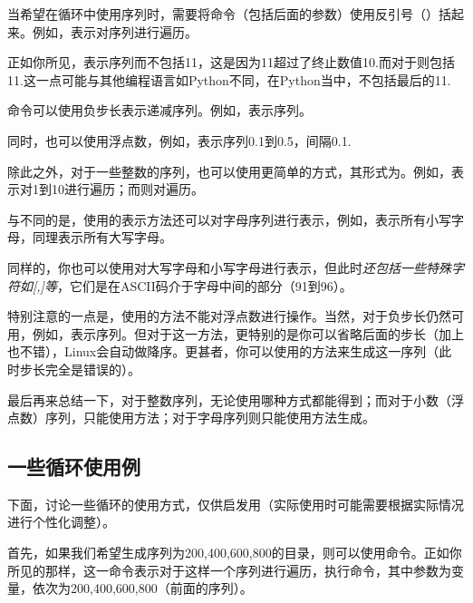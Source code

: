 当希望在循环中使用序列时，需要将命令（包括后面的参数）使用反引号（）括起来。例如，表示对序列进行遍历。

\begin{attention}
    正如你所见，表示序列而不包括11，这是因为11超过了终止数值10.而对于则包括11.这一点可能与其他编程语言如Python不同，在Python当中，不包括最后的11.

    命令可以使用负步长表示递减序列。例如，表示序列。

    同时，也可以使用浮点数，例如，表示序列0.1到0.5，间隔0.1.
\end{attention}

除此之外，对于一些整数的序列，也可以使用更简单的方式，其形式为。例如，表示对1到10进行遍历；而则对遍历。

与不同的是，使用的表示方法还可以对字母序列进行表示，例如，表示所有小写字母，同理表示所有大写字母。

\begin{attention}
    同样的，你也可以使用对大写字母和小写字母进行表示，但此时\emph{还包括一些特殊字符如[,]等}，它们是在ASCII码介于字母中间的部分（91到96）。

    特别注意的一点是，使用的方法不能对浮点数进行操作。当然，对于负步长仍然可用，例如，表示序列。但对于这一方法，更特别的是你可以省略后面的步长（加上也不错），Linux会自动做降序。更甚者，你可以使用的方法来生成这一序列（此时步长完全是错误的）。
\end{attention}

最后再来总结一下，对于整数序列，无论使用哪种方式都能得到；而对于小数（浮点数）序列，只能使用方法；对于字母序列则只能使用方法生成。


\subsection{一些循环使用例}\label{subsec:简单for循环-一些for循环使用例}

下面，讨论一些循环的使用方式，仅供启发用（实际使用时可能需要根据实际情况进行个性化调整）。

首先，如果我们希望生成序列为{200,400,600,800}的目录，则可以使用命令。正如你所见的那样，这一命令表示对于这样一个序列进行遍历，执行命令，其中参数为变量，依次为200,400,600,800（前面的序列）。

